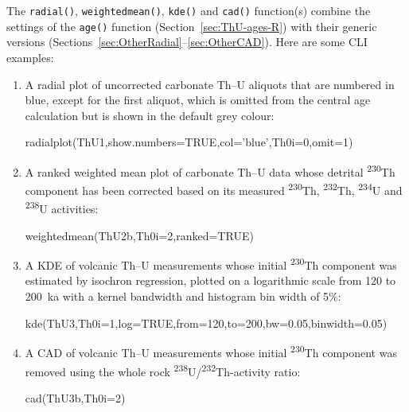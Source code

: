 \begin{refsection}
The \texttt{radial()}, \texttt{weightedmean()}, \texttt{kde()} and
\texttt{cad()} function(s) combine the settings of the \texttt{age()}
function (Section~\ref{sec:ThU-ages-R}) with their generic versions
(Sections~\ref{sec:OtherRadial}--\ref{sec:OtherCAD}). Here are some
CLI examples:

\begin{enumerate}

\item A radial plot of uncorrected carbonate Th--U aliquots that are
  numbered in blue, except for the first aliquot, which is omitted
  from the central age calculation but is shown in the default grey
  colour:
  
\begin{console}
radialplot(ThU1,show.numbers=TRUE,col='blue',Th0i=0,omit=1)
\end{console}

\item A ranked weighted mean plot of carbonate Th--U data whose
  detrital \textsuperscript{230}Th component has been corrected based
  on its measured \textsuperscript{230}Th, \textsuperscript{232}Th,
  \textsuperscript{234}U and \textsuperscript{238}U activities:

\begin{console}
weightedmean(ThU2b,Th0i=2,ranked=TRUE)
\end{console}

\item A KDE of volcanic Th--U measurements whose initial
  \textsuperscript{230}Th component was estimated by isochron
  regression, plotted on a logarithmic scale from 120 to 200~ka with a
  kernel bandwidth and histogram bin width of 5\%:

\begin{console}
kde(ThU3,Th0i=1,log=TRUE,from=120,to=200,bw=0.05,binwidth=0.05)
\end{console}

\item A CAD of volcanic Th--U measurements whose initial
  \textsuperscript{230}Th component was removed using the whole rock
  \textsuperscript{238}U/\textsuperscript{232}Th-activity ratio:

\begin{console}
cad(ThU3b,Th0i=2)
\end{console}
  
\end{enumerate}

\printbibliography[heading=subbibliography]

\end{refsection}
